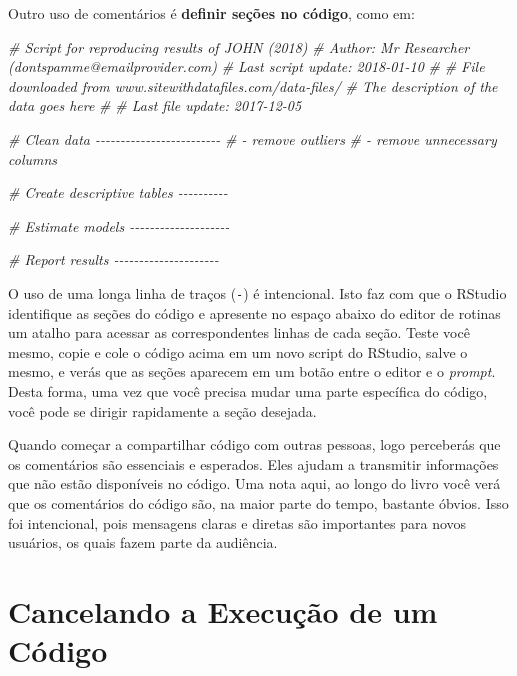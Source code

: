\documentclass[
  11pt,
]{book}
\newenvironment{Shaded}{\begin{snugshade}}{\end{snugshade}}
\newcommand{\CommentTok}[1]{\textcolor[rgb]{0.37,0.37,0.37}{\textit{#1}}}
\newenvironment{rmdcaution}
{\begin{cautionblock}

} {\end{cautionblock}}
\begin{document}
Outro uso de comentários é \textbf{definir seções no código}, como em:

\begin{Shaded}
\begin{Highlighting}[]
\CommentTok{\# Script for reproducing results of JOHN (2018)}
\CommentTok{\# Author: Mr Researcher (dontspamme@emailprovider.com)}
\CommentTok{\# Last script update: 2018{-}01{-}10}
\CommentTok{\#}
\CommentTok{\# File downloaded from www.sitewithdatafiles.com/data{-}files/}
\CommentTok{\# The description of the data goes here}
\CommentTok{\#}
\CommentTok{\# Last file update: 2017{-}12{-}05}

\CommentTok{\# Clean data {-}{-}{-}{-}{-}{-}{-}{-}{-}{-}{-}{-}{-}{-}{-}{-}{-}{-}{-}{-}{-}{-}{-}{-}{-}}
\CommentTok{\# {-} remove outliers}
\CommentTok{\# {-} remove unnecessary columns}

\CommentTok{\# Create descriptive tables {-}{-}{-}{-}{-}{-}{-}{-}{-}{-}}


\CommentTok{\# Estimate models {-}{-}{-}{-}{-}{-}{-}{-}{-}{-}{-}{-}{-}{-}{-}{-}{-}{-}{-}{-}}


\CommentTok{\# Report results {-}{-}{-}{-}{-}{-}{-}{-}{-}{-}{-}{-}{-}{-}{-}{-}{-}{-}{-}{-}{-}}
\end{Highlighting}
\end{Shaded}

O uso de uma longa linha de traços (\texttt{-}) é intencional. Isto faz com que o RStudio identifique as seções do código e apresente no espaço abaixo do editor de rotinas um atalho para acessar as correspondentes linhas de cada seção. Teste você mesmo, copie e cole o código acima em um novo script do RStudio, salve o mesmo, e verás que as seções aparecem em um botão entre o editor e o \emph{prompt}. Desta forma, uma vez que você precisa mudar uma parte específica do código, você pode se dirigir rapidamente a seção desejada.

\begin{rmdcaution}
Quando começar a compartilhar código com outras pessoas, logo perceberás
que os comentários são essenciais e esperados. Eles ajudam a transmitir
informações que não estão disponíveis no código. Uma nota aqui, ao longo
do livro você verá que os comentários do código são, na maior parte do
tempo, bastante óbvios. Isso foi intencional, pois mensagens claras e
diretas são importantes para novos usuários, os quais fazem parte da
audiência.
\end{rmdcaution}

\hypertarget{cancelando-a-execuuxe7uxe3o-de-um-cuxf3digo}{%
\section{Cancelando a Execução de um Código}\label{cancelando-a-execuuxe7uxe3o-de-um-cuxf3digo}}
\end{document}
